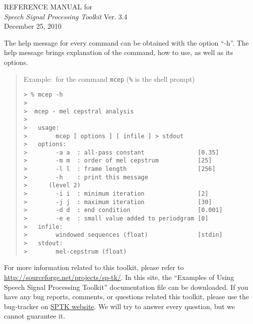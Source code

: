\documentclass[12pt]{book}
\begin{document}


\begin{titlepage} 
\vspace*{\fill}
 \begin{center}
        \LARGE
        {\rm REFERENCE MANUAL for} \\
        {\sl Speech Signal Processing Toolkit} Ver. 3.4 \\[10mm]
        {\rm December 25, 2010}
 \end{center}
\vspace*{\fill}
\vspace*{\fill}

\newpage
\thispagestyle{empty}
\vspace*{\fill}
\noindent
The help message for every command can be obtained
with the option ``-h''.
The help message brings explanation of the command, how to use, 
as well as its options.

\begin{quote}
 Example:~for the command \verb!mcep! (\verb!%! is the shell prompt)
 \begin{verbatim}
> % mcep -h
> 
>  mcep - mel cepstral analysis
> 
>   usage:
>        mcep [ options ] [ infile ] > stdout
>   options:
>        -a a  : all-pass constant               [0.35]
>        -m m  : order of mel cepstrum           [25]
>        -l l  : frame length                    [256]
>        -h    : print this message
>      (level 2)
>        -i i  : minimum iteration               [2]
>        -j j  : maximum iteration               [30]
>        -d d  : end condition                   [0.001]
>        -e e  : small value added to periodgram [0]
>   infile:
>        windowed sequences (float)              [stdin]
>   stdout:
>        mel-cepstrum (float)
 \end{verbatim}
\end{quote}
\vspace{\baselineskip}
\noindent
For more information related to this toolkit,
please refer to
\href{http://sourceforge.net/projects/sp-tk/}{http://sourceforge.net/projects/sp-tk/}.
In this site, the
``Examples of Using Speech Signal Processing Toolkit''
documentation file can be downloaded.
If you have any bug reports, comments, or questions
related this toolkit, please use the bug-tracker on
\href{http://sourceforge.net/tracker/?group_id=176586}{SPTK website}.
We will try to answer every question, but we cannot guarantee it.
\end{titlepage}

\cleardoublepage
\pagestyle{headings}
\tableofcontents
\end{document}
